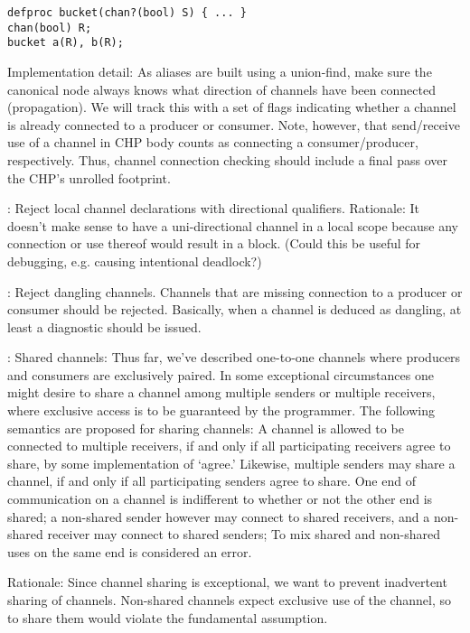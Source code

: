 \begin{verbatim}
defproc bucket(chan?(bool) S) { ... }
chan(bool) R;
bucket a(R), b(R);
\end{verbatim}

Implementation detail: 
As aliases are built using a union-find, make sure the canonical node
always knows what direction of channels have been connected (propagation).  
We will track this with a set of flags indicating whether a channel
is already connected to a producer or consumer.  
Note, however, that send/receive use of a channel in CHP body counts as 
connecting a consumer/producer, respectively.  
Thus, channel connection checking should include a final pass over
the CHP's unrolled footprint.  

: 
Reject local channel declarations with directional qualifiers.  
Rationale: It doesn't make sense to have a uni-directional channel
in a local scope because any connection or use thereof would result
in a block.  
(Could this be useful for debugging, e.g. causing intentional deadlock?)

: Reject dangling channels.  
Channels that are missing connection to a producer or consumer
should be rejected.  Basically, when a channel is deduced as dangling, 
at least a diagnostic should be issued.  

: Shared channels:
Thus far, we've described one-to-one channels where producers
and consumers are exclusively paired.  
In some exceptional circumstances one might desire to share a 
channel among multiple senders or multiple receivers, 
where exclusive access is to be guaranteed by the programmer.  
The following semantics are proposed for sharing channels:
A channel is allowed to be connected to multiple receivers, if and only if
all participating receivers agree to share, 
by some implementation of `agree.'
Likewise, multiple senders may share a channel, if and only if
all participating senders agree to share.  
One end of communication on a channel is indifferent
to whether or not the other end is shared; 
a non-shared sender however may connect to shared receivers, 
and a non-shared receiver may connect to shared senders;
To mix shared and non-shared uses on the same end is considered
an error.  

Rationale: Since channel sharing is exceptional, we want to prevent
inadvertent sharing of channels.  Non-shared channels expect 
exclusive use of the channel, so to share them would violate
the fundamental assumption.  


